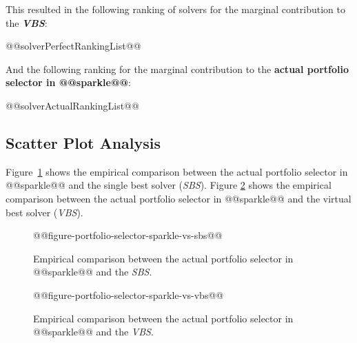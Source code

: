 \documentclass[british]{article}
\newif\iftest
\begin{document}
This resulted in the following ranking of solvers for the marginal contribution to the \textbf{{\em VBS}}:

\begin{enumerate}
@@solverPerfectRankingList@@
\end{enumerate}

And the following ranking for the marginal contribution to the \textbf{actual portfolio selector in @@sparkle@@}:

\begin{enumerate} 
@@solverActualRankingList@@
\end{enumerate}


\subsection{Scatter Plot Analysis}

Figure~\ref{fig:sparkle_vs_sbs} shows the empirical comparison between the actual portfolio selector in @@sparkle@@ and the single best solver (\emph{SBS}).
Figure \ref{fig:sparkle_vs_vbs} shows the empirical comparison between the actual portfolio selector in @@sparkle@@ and the virtual best solver (\emph{VBS}).

\begin{figure}[htbp]
\noindent \begin{centering}
@@figure-portfolio-selector-sparkle-vs-sbs@@
\par\end{centering}

\caption{Empirical comparison between the actual portfolio selector in @@sparkle@@ and the \emph{SBS}.}\label{fig:sparkle_vs_sbs}
\end{figure}

\begin{figure}[htbp]
\noindent \begin{centering}
@@figure-portfolio-selector-sparkle-vs-vbs@@
\par\end{centering}

\caption{Empirical comparison between the actual portfolio selector in @@sparkle@@ and the \emph{VBS}.}\label{fig:sparkle_vs_vbs}
\end{figure}


\iftest
\section{Experimental Results on the Test Set}
\label{sec:Experimental_Results_Test}

In this section, the PAR@@penalty@@ results for the current portfolio selector in @@sparkle@@ on solving the test instance set @@testInstanceClass@@ is reported.

\begin{itemize}
\item \textbf{Actual Portfolio Selector in @@sparkle@@}, PAR@@penalty@@: @@testActualPAR@@
\end{itemize}
\fi




\end{document}
